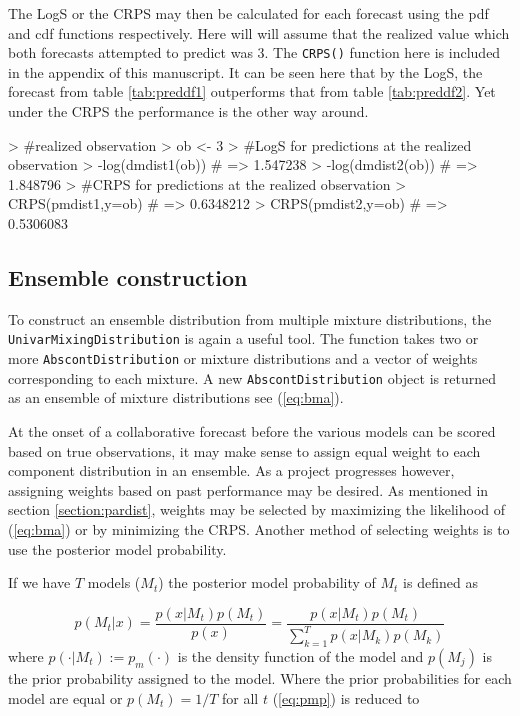 \documentclass[11pt,notitlepage]{isuthesis}
\begin{document}
The LogS or the CRPS may then be calculated for each forecast using the pdf
and cdf functions respectively. Here will will assume that the realized value
which both forecasts attempted to predict was 3. The \texttt{CRPS()} function 
here is 
included in the appendix of this manuscript. It can be seen here that by the 
LogS, the forecast from table \ref{tab:preddf1} outperforms that from table
\ref{tab:preddf2}. Yet under the CRPS the performance is the other way around.

\begin{Schunk}
\begin{Sinput}
> #realized observation
> ob <- 3
> #LogS for predictions at the realized observation
> -log(dmdist1(ob)) # => 1.547238
> -log(dmdist2(ob)) # => 1.848796
> #CRPS for predictions at the realized observation
> CRPS(pmdist1,y=ob) # => 0.6348212
> CRPS(pmdist2,y=ob) # => 0.5306083
\end{Sinput}
\end{Schunk}

\subsection{Ensemble construction}


To construct an ensemble distribution from multiple mixture distributions, the 
\texttt{UnivarMixingDistribution} is again a useful tool. The function takes 
two or more
\texttt{AbscontDistribution} or mixture distributions and a vector of weights 
corresponding to each mixture. A new \texttt{AbscontDistribution} object is 
returned as an ensemble of mixture distributions see (\ref{eq:bma}). 

At the onset of a collaborative forecast before the various models can be scored
based on true observations, it may make sense to assign equal weight to each 
component distribution in an ensemble. As a project progresses however, 
assigning weights based on past performance may be desired. As mentioned in 
section \ref{section:pardist}, weights may be selected by maximizing the
likelihood of (\ref{eq:bma}) or by minimizing the CRPS. Another method of 
selecting weights is to use the posterior model probability. 

If we have $T$ models ($M_t$) the posterior model probability of $M_t$ is 
defined as 

\begin{equation}
\label{eq:pmp}
p(M_t|x) = \frac{p(x|M_t)p(M_t)}{p(x)}
         = \frac{p(x|M_t)p(M_t)}{\sum_{k=1}^T p(x|M_k)p(M_k)}
\end{equation}
where $p(\cdot |M_t) := p_m(\cdot)$ is the density function of the model and 
$p(M_j)$ is the prior probability assigned to the model. Where the prior
probabilities for each model are equal or $p(M_t) = 1/T$ for all $t$ 
(\ref{eq:pmp}) is reduced to 
\end{document}
